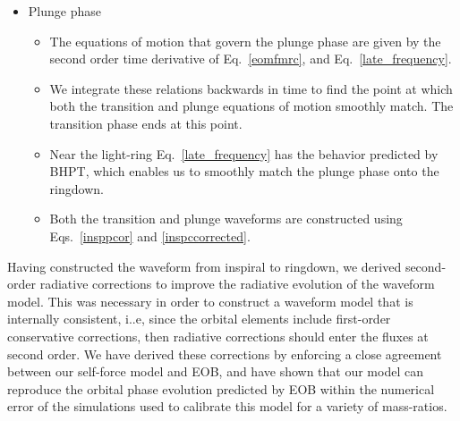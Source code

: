 \documentclass[aps,prd,showpacs,amssymb,floatfix,nofootinbib,superscriptaddress]{revtex4-1}%
\begin{document}
\begin{itemize}
\item{Plunge phase}
\begin{itemize}
\item The equations of motion that govern the plunge phase are given by the second order time derivative of Eq.~\eqref{eomfmrc}, and Eq.~\eqref{late_frequency}.
\item We integrate these relations backwards in time to find the point at which both the transition and plunge equations of motion smoothly match. The transition phase ends at this point.
\item Near the light-ring Eq.~\eqref{late_frequency} has the behavior predicted by BHPT, which enables us to smoothly match the plunge phase onto the ringdown. %
\item Both the transition and plunge waveforms are constructed using Eqs.~\eqref{insppcor} and \eqref{inspccorrected}.
\end{itemize}
\end{itemize}

Having constructed the waveform from inspiral to ringdown, we derived second-order radiative corrections to improve the radiative evolution of the waveform model. This was necessary in order to construct a waveform model that is internally consistent, i..e, since the orbital elements include first-order conservative corrections, then radiative corrections should enter the fluxes at second order. We have derived these corrections by enforcing a close agreement between our self-force model and EOB, and have shown that our model can reproduce the orbital phase evolution predicted by EOB within the numerical error of the simulations used to calibrate this model for a variety of mass-ratios. 
\end{document}
